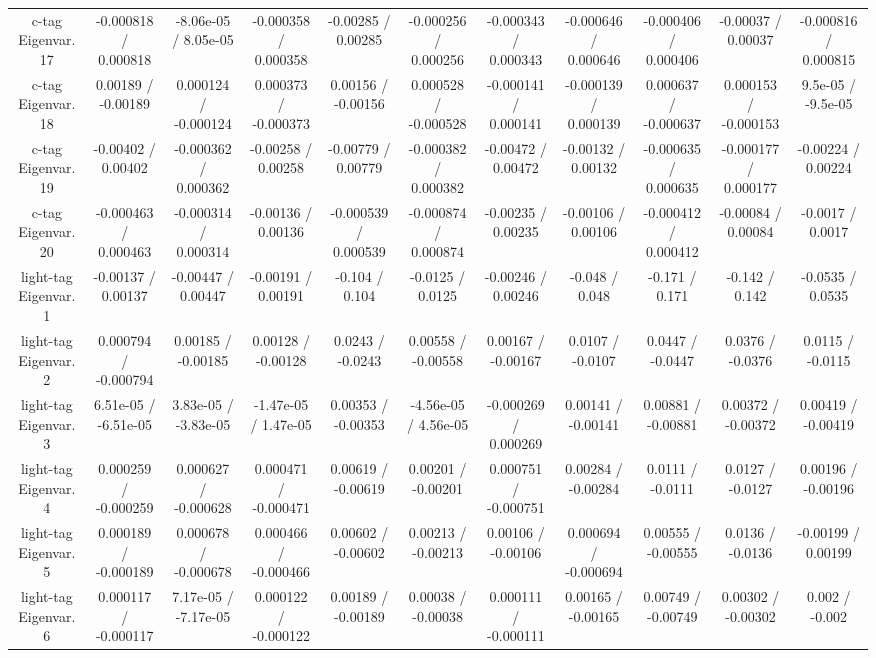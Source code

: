 \begin{table}[htbp]
\begin{center}
\begin{tabular}{|c|c|c|c|c|c|c|c|c|c|c|}
  c-tag Eigenvar. 17 & -0.000818 / 0.000818 & -8.06e-05 / 8.05e-05 & -0.000358 / 0.000358 & -0.00285 / 0.00285 & -0.000256 / 0.000256 & -0.000343 / 0.000343 & -0.000646 / 0.000646 & -0.000406 / 0.000406 & -0.00037 / 0.00037 & -0.000816 / 0.000815 \\ 
  c-tag Eigenvar. 18 & 0.00189 / -0.00189 & 0.000124 / -0.000124 & 0.000373 / -0.000373 & 0.00156 / -0.00156 & 0.000528 / -0.000528 & -0.000141 / 0.000141 & -0.000139 / 0.000139 & 0.000637 / -0.000637 & 0.000153 / -0.000153 & 9.5e-05 / -9.5e-05 \\ 
  c-tag Eigenvar. 19 & -0.00402 / 0.00402 & -0.000362 / 0.000362 & -0.00258 / 0.00258 & -0.00779 / 0.00779 & -0.000382 / 0.000382 & -0.00472 / 0.00472 & -0.00132 / 0.00132 & -0.000635 / 0.000635 & -0.000177 / 0.000177 & -0.00224 / 0.00224 \\ 
  c-tag Eigenvar. 20 & -0.000463 / 0.000463 & -0.000314 / 0.000314 & -0.00136 / 0.00136 & -0.000539 / 0.000539 & -0.000874 / 0.000874 & -0.00235 / 0.00235 & -0.00106 / 0.00106 & -0.000412 / 0.000412 & -0.00084 / 0.00084 & -0.0017 / 0.0017 \\ 
  light-tag Eigenvar. 1 & -0.00137 / 0.00137 & -0.00447 / 0.00447 & -0.00191 / 0.00191 & -0.104 / 0.104 & -0.0125 / 0.0125 & -0.00246 / 0.00246 & -0.048 / 0.048 & -0.171 / 0.171 & -0.142 / 0.142 & -0.0535 / 0.0535 \\ 
  light-tag Eigenvar. 2 & 0.000794 / -0.000794 & 0.00185 / -0.00185 & 0.00128 / -0.00128 & 0.0243 / -0.0243 & 0.00558 / -0.00558 & 0.00167 / -0.00167 & 0.0107 / -0.0107 & 0.0447 / -0.0447 & 0.0376 / -0.0376 & 0.0115 / -0.0115 \\ 
  light-tag Eigenvar. 3 & 6.51e-05 / -6.51e-05 & 3.83e-05 / -3.83e-05 & -1.47e-05 / 1.47e-05 & 0.00353 / -0.00353 & -4.56e-05 / 4.56e-05 & -0.000269 / 0.000269 & 0.00141 / -0.00141 & 0.00881 / -0.00881 & 0.00372 / -0.00372 & 0.00419 / -0.00419 \\ 
  light-tag Eigenvar. 4 & 0.000259 / -0.000259 & 0.000627 / -0.000628 & 0.000471 / -0.000471 & 0.00619 / -0.00619 & 0.00201 / -0.00201 & 0.000751 / -0.000751 & 0.00284 / -0.00284 & 0.0111 / -0.0111 & 0.0127 / -0.0127 & 0.00196 / -0.00196 \\ 
  light-tag Eigenvar. 5 & 0.000189 / -0.000189 & 0.000678 / -0.000678 & 0.000466 / -0.000466 & 0.00602 / -0.00602 & 0.00213 / -0.00213 & 0.00106 / -0.00106 & 0.000694 / -0.000694 & 0.00555 / -0.00555 & 0.0136 / -0.0136 & -0.00199 / 0.00199 \\ 
  light-tag Eigenvar. 6 & 0.000117 / -0.000117 & 7.17e-05 / -7.17e-05 & 0.000122 / -0.000122 & 0.00189 / -0.00189 & 0.00038 / -0.00038 & 0.000111 / -0.000111 & 0.00165 / -0.00165 & 0.00749 / -0.00749 & 0.00302 / -0.00302 & 0.002 / -0.002 \\ 

\end{tabular}
\end{center}
\end{table}
